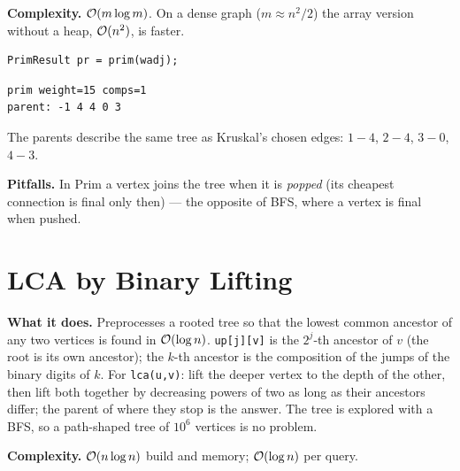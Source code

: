 \textbf{Complexity.} $\mathcal{O}(m\log m)$. On a dense graph ($m\approx n^2/2$) the array version without a heap, $\mathcal{O}(n^2)$, is faster.

\begin{lstlisting}[style=snippet]
PrimResult pr = prim(wadj);
\end{lstlisting}
\begin{lstlisting}[style=trace]
prim weight=15 comps=1
parent: -1 4 4 0 3
\end{lstlisting}

The parents describe the same tree as Kruskal's chosen edges: $1{-}4$, $2{-}4$, $3{-}0$, $4{-}3$.

\textbf{Pitfalls.} In Prim a vertex joins the tree when it is \emph{popped} (its cheapest connection is final only then) --- the opposite of BFS, where a vertex is final when pushed.



\clneed
\section{LCA by Binary Lifting}
\label{sec:cl-lca}

\textbf{What it does.} Preprocesses a rooted tree so that the lowest common ancestor of any two vertices is found in $\mathcal{O}(\log n)$. \texttt{up[j][v]} is the $2^j$-th ancestor of $v$ (the root is its own ancestor); the $k$-th ancestor is the composition of the jumps of the binary digits of $k$. For \texttt{lca(u,v)}: lift the deeper vertex to the depth of the other, then lift both together by decreasing powers of two as long as their ancestors differ; the parent of where they stop is the answer. The tree is explored with a BFS, so a path-shaped tree of $10^6$ vertices is no problem.

\textbf{Complexity.} $\mathcal{O}(n\log n)$ build and memory; $\mathcal{O}(\log n)$ per query.

